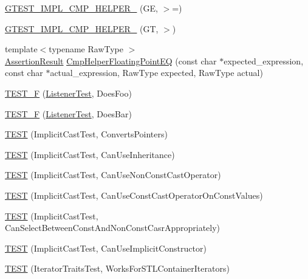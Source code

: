 \begin{DoxyCompactItemize}
\hyperlink{namespacetesting_1_1internal_abe184c499c47bbe6f9a4eb09ccf575bd}{\-G\-T\-E\-S\-T\-\_\-\-I\-M\-P\-L\-\_\-\-C\-M\-P\-\_\-\-H\-E\-L\-P\-E\-R\-\_\-} (\-G\-E, $>$=)
\item 
\hyperlink{namespacetesting_1_1internal_a7f7c4e81378f80fbc2a7b9ed4d75f48b}{\-G\-T\-E\-S\-T\-\_\-\-I\-M\-P\-L\-\_\-\-C\-M\-P\-\_\-\-H\-E\-L\-P\-E\-R\-\_\-} (\-G\-T, $>$)
\item 
{\footnotesize template$<$typename Raw\-Type $>$ }\\\hyperlink{classtesting_1_1AssertionResult}{\-Assertion\-Result} \hyperlink{namespacetesting_1_1internal_aaa7317360b59d9ebc020e240aaadd516}{\-Cmp\-Helper\-Floating\-Point\-E\-Q} (const char $\ast$expected\-\_\-expression, const char $\ast$actual\-\_\-expression, \-Raw\-Type expected, \-Raw\-Type actual)
\item 
\hyperlink{namespacetesting_1_1internal_a7e113e9c70d45d89fe1703e58ff083b9}{\-T\-E\-S\-T\-\_\-\-F} (\hyperlink{classtesting_1_1internal_1_1ListenerTest}{\-Listener\-Test}, \-Does\-Foo)
\item 
\hyperlink{namespacetesting_1_1internal_a02cef32090020d164460dd3d9f8e2852}{\-T\-E\-S\-T\-\_\-\-F} (\hyperlink{classtesting_1_1internal_1_1ListenerTest}{\-Listener\-Test}, \-Does\-Bar)
\item 
\hyperlink{namespacetesting_1_1internal_a5d2ec1128c80363b06070f403f682490}{\-T\-E\-S\-T} (\-Implicit\-Cast\-Test, \-Converts\-Pointers)
\item 
\hyperlink{namespacetesting_1_1internal_a1b304dcd3ac71095f2e7d9e9b43c4755}{\-T\-E\-S\-T} (\-Implicit\-Cast\-Test, \-Can\-Use\-Inheritance)
\item 
\hyperlink{namespacetesting_1_1internal_a8554484c7c0ea536bc393c254490aaff}{\-T\-E\-S\-T} (\-Implicit\-Cast\-Test, \-Can\-Use\-Non\-Const\-Cast\-Operator)
\item 
\hyperlink{namespacetesting_1_1internal_af7f631f9fbde27b19a65d50fc29e1420}{\-T\-E\-S\-T} (\-Implicit\-Cast\-Test, \-Can\-Use\-Const\-Cast\-Operator\-On\-Const\-Values)
\item 
\hyperlink{namespacetesting_1_1internal_a62a3b62658f9d47733cb7b5c8f69b2ad}{\-T\-E\-S\-T} (\-Implicit\-Cast\-Test, \-Can\-Select\-Between\-Const\-And\-Non\-Const\-Casr\-Appropriately)
\item 
\hyperlink{namespacetesting_1_1internal_ad5c2cf37cc5aa78744012255cae78f9b}{\-T\-E\-S\-T} (\-Implicit\-Cast\-Test, \-Can\-Use\-Implicit\-Constructor)
\item 
\hyperlink{namespacetesting_1_1internal_abd56ca990c5b8c1aea44d15028a74f33}{\-T\-E\-S\-T} (\-Iterator\-Traits\-Test, \-Works\-For\-S\-T\-L\-Container\-Iterators)

\end{DoxyCompactItemize}

